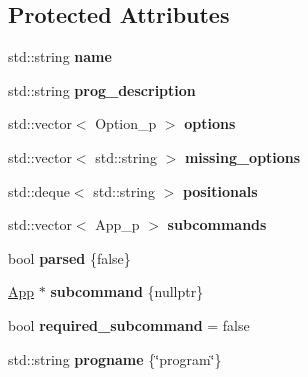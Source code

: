 \subsection*{Protected Attributes}
\begin{DoxyCompactItemize}
\item 
\mbox{\label{class_c_l_i_1_1_app_a38360542edd89036ac3a63adb4bcf74b}} 
std\+::string {\bfseries name}
\item 
\mbox{\label{class_c_l_i_1_1_app_a540c31eefcc925383630870d7de21f59}} 
std\+::string {\bfseries prog\+\_\+description}
\item 
\mbox{\label{class_c_l_i_1_1_app_af93df20844baeb53b7d858ce37a1e592}} 
std\+::vector$<$ Option\+\_\+p $>$ {\bfseries options}
\item 
\mbox{\label{class_c_l_i_1_1_app_aab8e0389dfad5c8e366e387a678be463}} 
std\+::vector$<$ std\+::string $>$ {\bfseries missing\+\_\+options}
\item 
\mbox{\label{class_c_l_i_1_1_app_a01e839fc768199b50c7824830d23d54a}} 
std\+::deque$<$ std\+::string $>$ {\bfseries positionals}
\item 
\mbox{\label{class_c_l_i_1_1_app_a07b0ba0ca85ac3321b62c709247db8d9}} 
std\+::vector$<$ App\+\_\+p $>$ {\bfseries subcommands}
\item 
\mbox{\label{class_c_l_i_1_1_app_ad65e732f10be9287b18f69ca785e1ac4}} 
bool {\bfseries parsed} \{false\}
\item 
\mbox{\label{class_c_l_i_1_1_app_a756522cc424c5e42123280e63af7a44d}} 
\hyperlink{class_c_l_i_1_1_app}{App} $\ast$ {\bfseries subcommand} \{nullptr\}
\item 
\mbox{\label{class_c_l_i_1_1_app_a905d679c4abaec067a9e721bae9ccf06}} 
bool {\bfseries required\+\_\+subcommand} = false
\item 
\mbox{\label{class_c_l_i_1_1_app_ab15e13b8abf7577e5e1f24ef56374790}} 
std\+::string {\bfseries progname} \{\char`\"{}program\char`\"{}\}

\end{DoxyCompactItemize}
